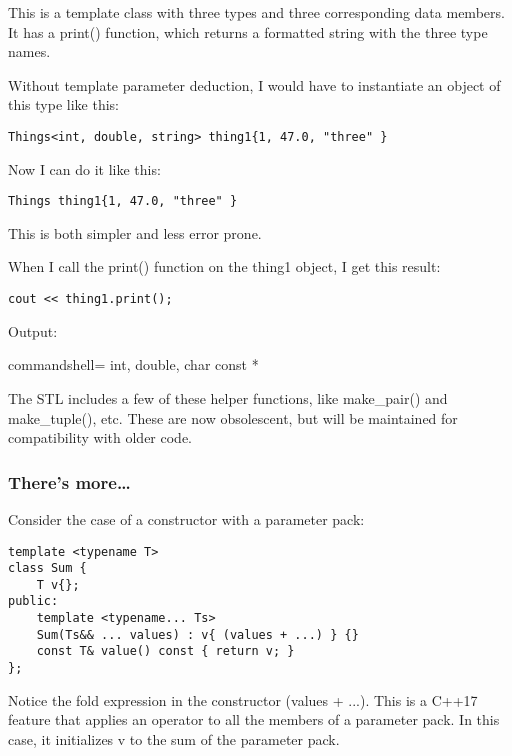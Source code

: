 This is a template class with three types and three corresponding data members. It has a print() function, which returns a formatted string with the three type names.

Without template parameter deduction, I would have to instantiate an object of this type like this:

\begin{lstlisting}[style=styleCXX]
Things<int, double, string> thing1{1, 47.0, "three" }
\end{lstlisting}

Now I can do it like this:

\begin{lstlisting}[style=styleCXX]
Things thing1{1, 47.0, "three" }
\end{lstlisting}

This is both simpler and less error prone.

When I call the print() function on the thing1 object, I get this result:

\begin{lstlisting}[style=styleCXX]
cout << thing1.print();
\end{lstlisting}

Output:

\begin{tcblisting}{commandshell={}}
int, double, char const *
\end{tcblisting}

The STL includes a few of these helper functions, like make\_pair() and make\_tuple(), etc. These are now obsolescent, but will be maintained for compatibility with older code.

\subsubsection{There's more…}

Consider the case of a constructor with a parameter pack:

\begin{lstlisting}[style=styleCXX]
template <typename T>
class Sum {
	T v{};
public:
	template <typename... Ts>
	Sum(Ts&& ... values) : v{ (values + ...) } {}
	const T& value() const { return v; }
};
\end{lstlisting}

Notice the fold expression in the constructor (values + ...). This is a C++17 feature that applies an operator to all the members of a parameter pack. In this case, it initializes v to the sum of the parameter pack.

